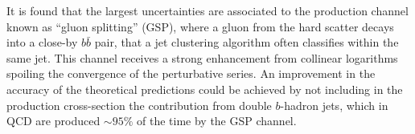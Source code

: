 It is found that the largest uncertainties are associated to the production channel known as ``gluon splitting'' (GSP), where a gluon from the hard scatter decays into a close-by $b\bar{b}$ pair, that a jet clustering algorithm often classifies within the same jet. This channel receives a strong enhancement from collinear logarithms spoiling the convergence of the perturbative series. 
An improvement in the accuracy of the theoretical predictions could be achieved by not including  in the production cross-section the contribution from double $b$-hadron jets, which in QCD %
are produced $\sim95\%$ of the time by the GSP channel.  


%
%

